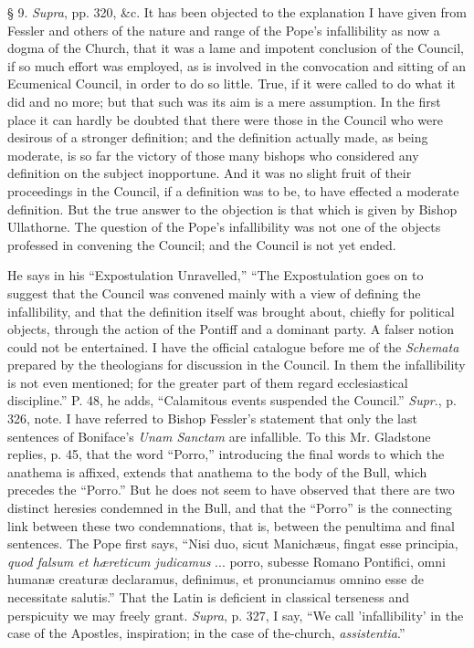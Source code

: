 § 9.
\emph{Supra}, pp. 320, \&c. It has been objected to the explanation I
have given from Fessler and others of the nature and range of the Pope's
infallibility as now a dogma of the Church, that it was a lame and
impotent conclusion of the Council, if so much effort was employed, as
is involved in the convocation and sitting of an Ecumenical Council, in
order to do so little. True, if it were called to do what it did and no
more; but that such was its aim is a mere assumption. In the first place
it can hardly be doubted that there were those in the Council who were
desirous of a stronger definition; and the definition actually made, as
being moderate, is so far the victory of those many bishops who
considered any definition on the subject inopportune. And it was no
slight fruit of their proceedings in the Council, if a definition
was to be, to have effected a moderate definition. But the true answer
to the objection is that which is given by Bishop Ullathorne. The
question of the Pope's infallibility was not one of the objects
professed in convening the Council; and the Council is not yet ended.

He says in his ``Expostulation Unravelled,'' ``The
Expostulation goes on to suggest that the Council was convened mainly
with a view of defining the infallibility, and that the definition
itself was brought about, chiefly for political objects, through the
action of the Pontiff and a dominant party. A falser notion could not be
entertained. I have the official catalogue before me of the \emph{Schemata}
prepared by the theologians for discussion in the Council. In them the
infallibility is not even mentioned; for the greater part of them regard
ecclesiastical discipline.'' P. 48, he adds, ``Calamitous events
suspended the Council.''
\emph{Supr}., p. 326, note. I have referred to Bishop Fessler's
statement that only the last sentences of Boniface's \emph{Unam Sanctam}
are infallible. To this Mr. Gladstone replies, p. 45, that the word
``Porro,'' introducing the final words to which the anathema is
affixed, extends that anathema to the body of the Bull, which precedes
the ``Porro.'' But he does not seem to have observed that there
are two distinct heresies condemned in the Bull, and that the ``Porro''
is the connecting link between these two condemnations, that is, between
the penultima and final sentences. The Pope first says, ``Nisi duo,
sicut Manichæus, fingat esse principia, \emph{quod falsum et
hæreticum judicamus} ... porro, subesse Romano Pontifici, omni
humanæ creaturæ declaramus, definimus, et pronunciamus omnino esse de
necessitate salutis.'' That the Latin is deficient in classical
terseness and perspicuity we may freely grant.
\emph{Supra}, p. 327, I say, ``We call 'infallibility' in the case
of the Apostles, inspiration; in the case of the-church, \emph{assistentia}.''

